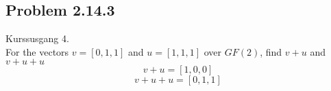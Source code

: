 \subsection{Problem 2.14.3}
Kurssusgang 4.\\
For the vectors $v=[0,1,1]$ and $u=[1,1,1]$ over $GF(2)$, find $v+u$ and $v+u+u$
\begin{equation}
    v+u=[1,0,0]
\end{equation}
\begin{equation}
    v+u+u=[0,1,1]
\end{equation}